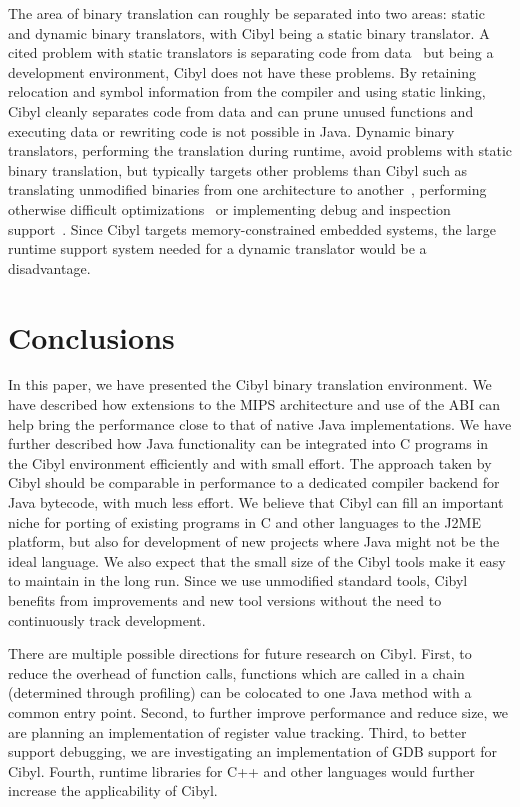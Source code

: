 The area of binary translation can roughly be separated into two areas: static
and dynamic binary translators, with Cibyl being a static binary translator. A
cited problem with static translators is separating code from
data~\cite{altman00welcome} but being a development environment, Cibyl does
not have these problems. By retaining relocation and symbol information from
the compiler and using static linking, Cibyl cleanly separates code from data
and can prune unused functions and executing data or rewriting code is not
possible in Java. Dynamic binary translators, performing the translation
during runtime, avoid problems with static binary translation, but typically
targets other problems than Cibyl such as translating unmodified binaries from
one architecture to another~\cite{hookway97fx32}, performing otherwise
difficult optimizations~\cite{bala00dynamo} or implementing debug and
inspection support~\cite{valgrind}. Since Cibyl targets memory-constrained
embedded systems, the large runtime support system needed for a dynamic
translator would be a disadvantage.


\section{Conclusions}
\label{sec:cibyl:conclusions}
In this paper, we have presented the Cibyl binary translation environment. We
have described how extensions to the MIPS architecture and use of the ABI can
help bring the performance close to that of native Java implementations. We
have further described how Java functionality can be integrated into C
programs in the Cibyl environment efficiently and with small effort. The
approach taken by Cibyl should be comparable in performance to a dedicated
compiler backend for Java bytecode, with much less effort.  We believe that
Cibyl can fill an important niche for porting of existing programs in C and
other languages to the J2ME platform, but also for development of new projects
where Java might not be the ideal language. We also expect that the small size
of the Cibyl tools make it easy to maintain in the long run. Since we use
unmodified standard tools, Cibyl benefits from improvements and new tool
versions without the need to continuously track development.

There are multiple possible directions for future research on Cibyl. First, to
reduce the overhead of function calls, functions which are called in a chain
(determined through profiling) can be colocated to one Java method with a
common entry point. Second, to further improve performance and reduce size, we
are planning an implementation of register value tracking. Third, to better
support debugging, we are investigating an implementation of GDB support for
Cibyl. Fourth, runtime libraries for C++ and other languages would further
increase the applicability of Cibyl.


